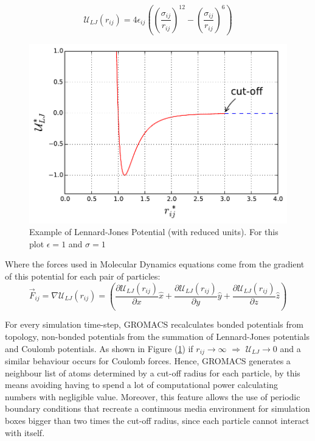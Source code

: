 \documentclass[10pt,a4paper,twoside]{article}
\begin{document}
\begin{equation}
\mathcal{U}_{LJ}(r_{ij}) = 4\epsilon_{ij}\left(\left( \dfrac{\sigma_{ij}}{r_{ij}}\right)^{12} - \left( \dfrac{\sigma_{ij}}{r_{ij}}\right)^6\right) 
\label{eqn:ljpot}
\end{equation}

 \begin{figure}[ht]
  \begin{center}
	\includegraphics[width=0.6 \textwidth]{./graphs/lj}
	\caption{Example of Lennard-Jones Potential (with reduced units). For this plot $\epsilon = 1$ and $\sigma = 1$ }
	\label{gfx:ljg}
	\end{center}
	\end{figure}

Where the forces used in Molecular Dynamics equations come from the gradient of this potential for each pair of particles:
\begin{equation}
\vec{F}_{ij} = \nabla\mathcal{U}_{LJ}(r_{ij}) = \left( \dfrac{\partial\mathcal{U}_{LJ}(r_{ij})}{\partial x}\hat{x} + \dfrac{\partial\mathcal{U}_{LJ}(r_{ij})}{\partial y}\hat{y}+\dfrac{\partial\mathcal{U}_{LJ}(r_{ij})}{\partial z}\hat{z}\right) 
\label{eqn:ljf}
\end{equation}

For every simulation time-step, GROMACS recalculates bonded potentials from topology, non-bonded potentials from the summation of Lennard-Jones potentials and Coulomb potentials. As shown in Figure (\ref{gfx:ljg}) if $r_{ij} \rightarrow \infty$ $\Rightarrow$ $\mathcal{U}_{LJ} \rightarrow 0$ and a similar behaviour occurs for Coulomb forces. Hence, GROMACS generates a neighbour list of atoms determined by a cut-off radius for each particle, by this means avoiding having to spend a lot of computational power calculating numbers with negligible value. Moreover, this feature allows the use of periodic boundary conditions that recreate a continuous media environment for simulation boxes bigger than  two times the cut-off radius, since each particle cannot interact with itself. 
\end{document}

